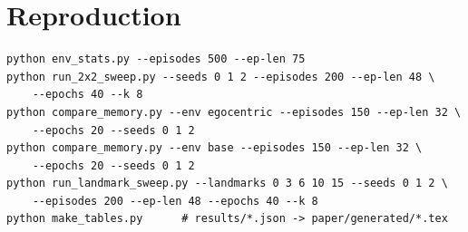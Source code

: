 \documentclass[11pt]{article}
\begin{document}
\appendix
\section{Reproduction}

{\footnotesize
\begin{verbatim}
python env_stats.py --episodes 500 --ep-len 75
python run_2x2_sweep.py --seeds 0 1 2 --episodes 200 --ep-len 48 \
    --epochs 40 --k 8
python compare_memory.py --env egocentric --episodes 150 --ep-len 32 \
    --epochs 20 --seeds 0 1 2
python compare_memory.py --env base --episodes 150 --ep-len 32 \
    --epochs 20 --seeds 0 1 2
python run_landmark_sweep.py --landmarks 0 3 6 10 15 --seeds 0 1 2 \
    --episodes 200 --ep-len 48 --epochs 40 --k 8
python make_tables.py      # results/*.json -> paper/generated/*.tex
\end{verbatim}
}
\end{document}
